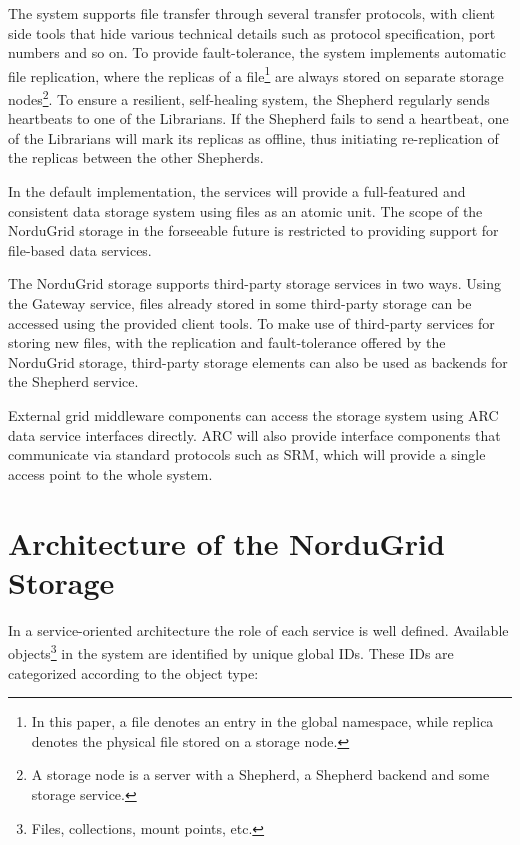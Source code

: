 \documentclass[final]{ieee}
\begin{document}
The system supports file transfer through several transfer protocols,
with client side tools that hide various technical
details such as protocol specification, port numbers
and so on. To provide fault-tolerance, the system implements
automatic file replication, where
the replicas of a file\footnote{In this paper, a file
denotes an entry in the global namespace, while replica denotes the
physical file stored on a storage node.} are always stored on separate
storage nodes\footnote{A
  storage node is a server with a Shepherd, a Shepherd backend
and some storage service.}. To ensure a resilient, self-healing system, the Shepherd
regularly sends heartbeats to one of the Librarians. If the Shepherd fails
to send a heartbeat, one of the Librarians will mark its replicas as offline, thus initiating
re-replication of the replicas between the other Shepherds.

In the default implementation, the services will provide a
full-featured and consistent data storage system using files as an
atomic unit. The scope of the NorduGrid storage in the forseeable
future is restricted to providing support for file-based data services.

The NorduGrid storage supports third-party storage services in two
ways. Using the Gateway service, files already stored in some
third-party storage can be accessed using the provided client tools. To make use of third-party services for storing new
files, with the replication and fault-tolerance offered by the NorduGrid storage, third-party storage elements can also be used as backends for the
Shepherd service.

External grid middleware components can
access the storage system using ARC data service
interfaces directly. ARC will also provide interface
components that communicate via standard protocols such as SRM, which
will provide a single access point to the whole system.

\section{Architecture of the NorduGrid Storage}
\label{Architecture of the NorduGrid Storage}

In a service-oriented architecture
the role of each service is well defined. Available
objects\footnote{Files, collections, mount points, etc.} in the
system are identified by unique global IDs. These IDs are
categorized according to the object type:
\end{document}

